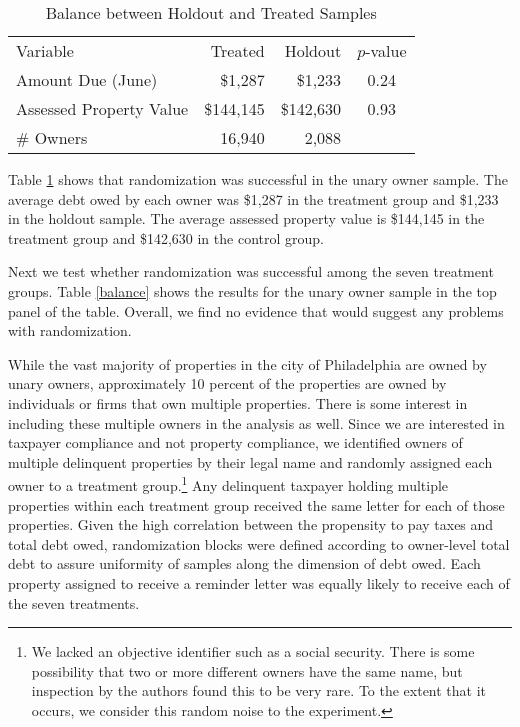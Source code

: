 \documentclass[12pt]{article}
\begin{document}
\begin{table}[ht]
\centering
\caption{Balance between Holdout and Treated Samples}\label{bal_hold}
\bigskip
\begin{tabular}{lrrc}
   \hline
Variable & Treated & Holdout & $p$-value \\ 
  Amount Due (June) & \$1,287 & \$1,233 & 0.24 \\ 
  Assessed Property Value & \$144,145 & \$142,630 & 0.93 \\ 
  \# Owners & 16,940 & 2,088 &  \\ 
   \hline
\end{tabular}
\end{table}

Table \ref{bal_hold} shows that randomization was successful in the
unary owner sample.  The average debt owed by each owner was \$1,287
in the treatment group and \$1,233 in the holdout sample. The average
assessed property value is \$144,145 in the treatment group and
\$142,630 in the control group.

Next we test whether randomization was successful among the seven
treatment groups. Table \ref{balance} shows the results for the unary
owner sample in the top panel of the table. Overall, we find no
evidence that would suggest any problems with randomization.

While the vast majority of properties in the city of Philadelphia are
owned by unary owners, approximately 10 percent of the properties are
owned by individuals or firms that own multiple properties. There is
some interest in including these multiple owners in the analysis as
well. Since we are interested in taxpayer compliance and not property
compliance, we identified owners of multiple delinquent properties by
their legal name and randomly assigned each owner to a
treatment group.\footnote{We lacked an objective
  identifier such as a social security.  There is some possibility that two or more
  different owners have the same name, but inspection by the
  authors found this to be very rare.  To the extent that it occurs,
  we consider this random noise
  to the experiment.} Any delinquent taxpayer holding multiple properties
within each treatment group received the same letter for each of those
properties.  Given the high correlation between the propensity to pay
taxes and total debt owed, randomization blocks were defined according
to owner-level total debt to assure uniformity of samples along the
dimension of debt owed. Each property assigned to
receive a reminder letter was equally likely to receive each of the
seven treatments.
\end{document}
